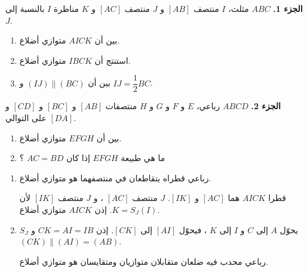 \documentclass[12pt,a4paper]{article}
\begin{document}
\begin{corr}[title={تركيب : مستقيم المنتصفين}, stars=4, source={Axiomaths}]
\textbf{الجزء 1.} $ABC$ مثلث، $I$ منتصف $[AB]$ و $J$ منتصف $[AC]$ و $K$ مناظرة $I$ بالنسبة إلى $J$.
\begin{enumerate}
  \item بين أن $AICK$ متوازي أضلاع.
  \item استنتج أن $IBCK$ متوازي أضلاع.
  \item بين أن $(IJ)\parallel(BC)$ و $IJ=\dfrac{1}{2}BC$.
\end{enumerate}
\textbf{الجزء 2.} $ABCD$ رباعي، $E$ و $F$ و $G$ و $H$ منتصفات $[AB]$ و $[BC]$ و $[CD]$ و $[DA]$ على التوالي.
\begin{enumerate}[resume]
  \item بين أن $EFGH$ متوازي أضلاع.
  \item ما هي طبيعة $EFGH$ إذا كان $AC=BD$ ؟
\end{enumerate}
\begin{center}
\qquad
{}
\end{center}
\axsol
\begin{enumerate}[itemsep=14pt]
  \item\leavevmode
  \begin{prop}
  رباعي قطراه يتقاطعان في منتصفهما هو متوازي أضلاع.
  \end{prop}
  قطرا $AICK$ هما $[AC]$ و $[IK]$. $J$ منتصف $[AC]$ ، و $J$ منتصف $[IK]$ لأن $K=S_J(I)$. إذن $AICK$ متوازي أضلاع.
  \item $S_J$ يحوّل $A$ إلى $C$ و $I$ إلى $K$ ، فيحوّل $[AI]$ إلى $[CK]$. إذن $CK=AI=IB$ و $(CK)\parallel(AI)=(AB)$.
  \begin{prop}[معيار]
  رباعي محدب فيه ضلعان متقابلان متوازيان ومتقايسان هو متوازي أضلاع.

\end{prop}
\end{enumerate}
\end{corr}
\end{document}
